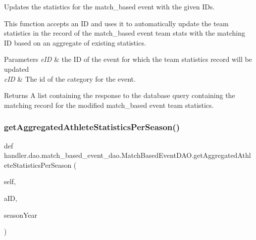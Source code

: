 Updates the statistics for the match\+\_\+based event with the given I\+Ds. 

This function accepts an ID and uses it to automatically update the team statistics in the record of the match\+\_\+based event team stats with the matching ID based on an aggregate of existing statistics.


\begin{DoxyParams}{Parameters}
{\em e\+ID} & the ID of the event for which the team statistics record will be updated \\
\hline
{\em c\+ID} & The id of the category for the event.\\
\hline
\end{DoxyParams}
\begin{DoxyReturn}{Returns}
A list containing the response to the database query containing the matching record for the modified match\+\_\+based event team statistics. 
\end{DoxyReturn}
\mbox{\label{classhandler_1_1dao_1_1match__based__event__dao_1_1_match_based_event_d_a_o_a2bed0763d424720ba51c10d714252720}} 
\subsubsection{\texorpdfstring{get\+Aggregated\+Athlete\+Statistics\+Per\+Season()}{getAggregatedAthleteStatisticsPerSeason()}}
{\footnotesize\ttfamily def handler.\+dao.\+match\+\_\+based\+\_\+event\+\_\+dao.\+Match\+Based\+Event\+D\+A\+O.\+get\+Aggregated\+Athlete\+Statistics\+Per\+Season (\begin{DoxyParamCaption}\item[{}]{self,  }\item[{}]{a\+ID,  }\item[{}]{season\+Year }\end{DoxyParamCaption})}



